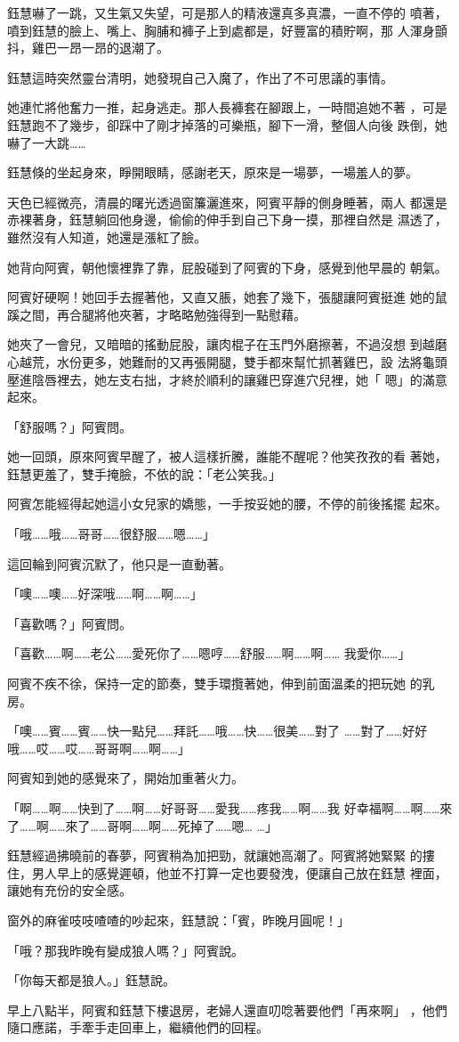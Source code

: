鈺慧嚇了一跳，又生氣又失望，可是那人的精液還真多真濃，一直不停的
噴著，噴到鈺慧的臉上、嘴上、胸脯和褲子上到處都是，好豐富的積貯啊，那
人渾身顫抖，雞巴一昂一昂的退潮了。

鈺慧這時突然靈台清明，她發現自己入魔了，作出了不可思議的事情。

她連忙將他奮力一推，起身逃走。那人長褲套在腳跟上，一時間追她不著
，可是鈺慧跑不了幾步，卻踩中了剛才掉落的可樂瓶，腳下一滑，整個人向後
跌倒，她嚇了一大跳……

鈺慧倏的坐起身來，睜開眼睛，感謝老天，原來是一場夢，一場羞人的夢。

天色已經微亮，清晨的曙光透過窗簾灑進來，阿賓平靜的側身睡著，兩人
都還是赤裸著身，鈺慧躺回他身邊，偷偷的伸手到自己下身一摸，那裡自然是
濕透了，雖然沒有人知道，她還是漲紅了臉。

她背向阿賓，朝他懷裡靠了靠，屁股碰到了阿賓的下身，感覺到他早晨的
朝氣。

阿賓好硬啊！她回手去握著他，又直又脹，她套了幾下，張腿讓阿賓挺進
她的鼠蹊之間，再合腿將他夾著，才略略勉強得到一點慰藉。

她夾了一會兒，又暗暗的搖動屁股，讓肉棍子在玉門外磨擦著，不過沒想
到越磨心越荒，水份更多，她難耐的又再張開腿，雙手都來幫忙抓著雞巴，設
法將龜頭壓進陰唇裡去，她左支右拙，才終於順利的讓雞巴穿進穴兒裡，她「
嗯」的滿意起來。

「舒服嗎？」阿賓問。

她一回頭，原來阿賓早醒了，被人這樣折騰，誰能不醒呢？他笑孜孜的看
著她，鈺慧更羞了，雙手掩臉，不依的說：「老公笑我。」

阿賓怎能經得起她這小女兒家的嬌態，一手按妥她的腰，不停的前後搖擺
起來。

「哦……哦……哥哥……很舒服……嗯……」

這回輪到阿賓沉默了，他只是一直動著。

「噢……噢……好深哦……啊……啊……」

「喜歡嗎？」阿賓問。

「喜歡……啊……老公……愛死你了……嗯哼……舒服……啊……啊……
我愛你……」

阿賓不疾不徐，保持一定的節奏，雙手環攬著她，伸到前面溫柔的把玩她
的乳房。

「噢……賓……賓……快一點兒……拜託……哦……快……很美……對了
……對了……好好哦……哎……哎……哥哥啊……啊……」

阿賓知到她的感覺來了，開始加重著火力。

「啊……啊……快到了……啊……好哥哥……愛我……疼我……啊……我
好幸福啊……啊……來了……啊……來了……哥啊……啊……死掉了……嗯…
…」

鈺慧經過拂曉前的春夢，阿賓稍為加把勁，就讓她高潮了。阿賓將她緊緊
的摟住，男人早上的感覺遲頓，他並不打算一定也要發洩，便讓自己放在鈺慧
裡面，讓她有充份的安全感。

窗外的麻雀吱吱喳喳的吵起來，鈺慧說：「賓，昨晚月圓呢！」

「哦？那我昨晚有變成狼人嗎？」阿賓說。

「你每天都是狼人。」鈺慧說。

早上八點半，阿賓和鈺慧下樓退房，老婦人還直叨唸著要他們「再來啊」
，他們隨口應諾，手牽手走回車上，繼續他們的回程。










